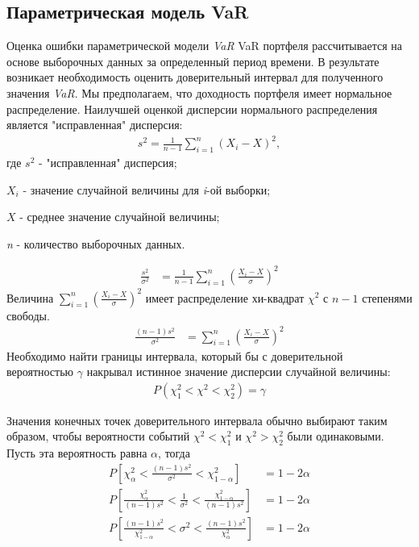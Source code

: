 \documentclass[_fin_decisions_lectures.tex]{subfiles}
\begin{document}
\subsection{Параметрическая модель VaR}
\begin{frame}[shrink=10]{Оценка ошибки параметрической модели \textit{VaR}} 
VaR портфеля рассчитывается на основе выборочных данных за определенный период времени. В результате возникает необходимость оценить доверительный интервал для полученного значения \textit{VaR}. 
Мы предполагаем, что доходность портфеля имеет нормальное распределение. Наилучшей оценкой дисперсии нормального распределения является "исправленная" дисперсия:
\begin{align}
s^2=\frac{1}{n-1}\sum\limits_{i=1}^n(X_i-X)^2,
\end{align}
где $s^2$ - "исправленная" дисперсия;

$X_i$ - значение случайной величины для \textit{i}-ой выборки; 

$X$ - среднее значение случайной величины; 

\textit{n} - количество выборочных данных.

\end{frame}
\begin{frame}[shrink=10]
\begin{align*}
\frac{s^2}{\sigma^2} & =\frac{1}{n-1}\sum_{i=1}^n\left(\frac{X_i-X}{\sigma}\right)^2
\end{align*}
Величина $\sum\limits_{i=1}^n\left(\frac{X_i-X}{\sigma}\right)^2$ имеет распределение хи-квадрат $\chi^2$ с $n-1$ степенями свободы. 
\begin{align}
\frac{(n-1)s^2}{\sigma^2} & =\sum_{i=1}^n\left(\frac{X_i-X}{\sigma}\right)^2
\end{align}
Необходимо найти границы интервала, который бы с доверительной вероятностью $\gamma$ накрывал истинное значение дисперсии случайной величины:
\begin{align}
P(\chi_1^2<\chi^2<\chi_2^2)=\gamma
\end{align}
\end{frame}
\begin{frame}
Значения конечных точек доверительного интервала обычно выбирают таким образом, чтобы вероятности событий $\chi^2<\chi_1^2$ и $\chi^2>\chi_2^2$ были одинаковыми. Пусть эта вероятность равна $\alpha$, тогда
\begin{align}
P\left[\chi_{\alpha}^2<\frac{(n-1)s^2}{\sigma^2}<\chi_{1-\alpha}^2\right] & =1-2\alpha \nonumber \\
P\left[\frac{\chi_{\alpha}^2}{(n-1)s^2}<\frac{1}{\sigma^2}<\frac{\chi_{1-\alpha}^2}{(n-1)s^2}\right] & =1-2\alpha \nonumber \\
P\left[\frac{(n-1)s^2}{\chi_{1-\alpha}^2}<\sigma^2<\frac{(n-1)s^2}{\chi_{\alpha}^2}\right] & =1-2\alpha
\end{align}
\end{frame}
\end{document}
